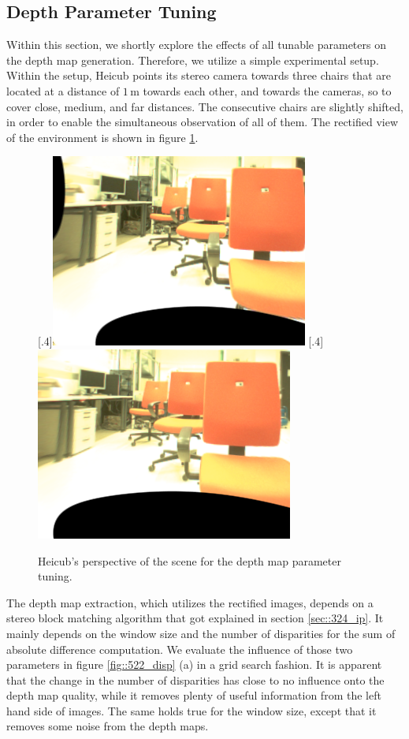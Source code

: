 \subsection{Depth Parameter Tuning}
Within this section, we shortly explore the effects of all tunable parameters on the depth map generation. Therefore, we utilize a simple experimental setup. Within the setup, Heicub points its stereo camera towards three chairs that are located at a distance of $1\,\text{m}$ towards each other, and towards the cameras, so to cover close, medium, and far distances. The consecutive chairs are slightly shifted, in order to enable the simultaneous observation of all of them. The rectified view of the environment is shown in figure \ref{fig::522_wls_rgb}.
\begin{figure}[h]
	\centering
	[.4\linewidth]{\includegraphics[scale=.3]{chapters/05_experiments/02_autonomous_walking/02_depth_map_parameter_tuning/l_rgb.png}}
	[.4\linewidth]{\includegraphics[scale=.3]{chapters/05_experiments/02_autonomous_walking/02_depth_map_parameter_tuning/r_rgb.png}}
	\caption{Heicub's perspective of the scene for the depth map parameter tuning.}
	\label{fig::522_wls_rgb}
\end{figure}
The depth map extraction, which utilizes the rectified images, depends on a stereo block matching algorithm that got explained in section \ref{sec::324_ip}. It mainly depends on the window size and the number of disparities for the sum of absolute difference computation. We evaluate the influence of those two parameters in figure \ref{fig::522_disp} (a) in a grid search fashion. It is apparent that the change in the number of disparities has close to no influence onto the depth map quality, while it removes plenty of useful information from the left hand side of images. The same holds true for the window size, except that it removes some noise from the depth maps.
